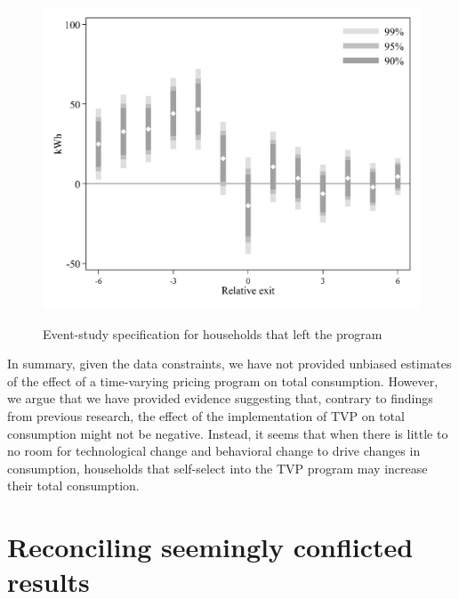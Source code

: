 \documentclass[12pt]{article}
\begin{document}
\begin{figure}[ht]
  \caption{Event-study specification for households that left the program}\label{fig:three}
  \begin{center}
  {\includegraphics[width=1\textwidth]{./figures/image3.png}}
  \end{center}
\end{figure}

In summary, given the data constraints, we have not provided unbiased estimates of the effect of a time-varying pricing program on total consumption. However, we argue that we have provided evidence suggesting that, contrary to findings from previous research, the effect of the implementation of TVP on total consumption might not be negative. Instead, it seems that when there is little to no room for technological change and behavioral change to drive changes in consumption, households that self-select into the TVP program may increase their total consumption.

\section{Reconciling seemingly conflicted results}
\end{document}
